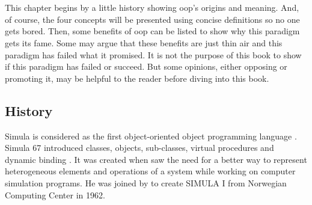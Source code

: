 \documentclass[12pt]{book}
\begin{document}
\fi

\chapter{}

\begin{introduction} %
	This chapter begins by a little history showing \ac{oop}'s origins and meaning.
	And, of course, the four concepts will be presented using concise definitions so no one gets bored.
	Then, some benefits of \ac{oop} can be listed to show why this paradigm gets its fame.
	Some may argue that these benefits are just thin air and this paradigm has failed what it promised.  
	It is not the purpose of this book to show if this paradigm has failed or succeed. 
	But some opinions, either opposing or promoting it, may be helpful to the reader before diving into this book.
\end{introduction}

\section{History}

Simula is considered as the first object-oriented object programming language \citep{2004-huang}.
Simula 67 introduced classes, objects, sub-classes, virtual procedures and dynamic binding \citep{2013-black}.
It was created when  saw the need for a better way to represent heterogeneous elements and operations of a system while working on computer simulation programs.
He was joined by  to create SIMULA I from Norwegian Computing Center in 1962.
\end{document}
